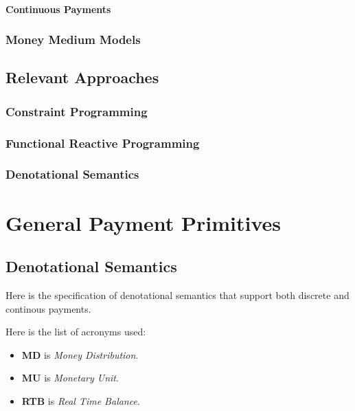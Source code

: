 \documentclass[a4paper]{report}
\begin{document}
\subsubsection{Continuous Payments}

\subsection{Money Medium Models}

\section{Relevant Approaches}

\subsection{Constraint Programming}

\subsection{Functional Reactive Programming}

\subsection{Denotational Semantics}

\chapter{General Payment Primitives}

\section{Denotational Semantics}

Here is the specification of denotational semantics that support both discrete and continous payments.

Here is the list of acronyms used:

\begin{itemize}
    \item \textbf{MD} is \textit{Money Distribution}.
    \item \textbf{MU} is \textit{Monetary Unit}.
    \item \textbf{RTB} is \textit{Real Time Balance}.
\end{itemize}
\end{document}
